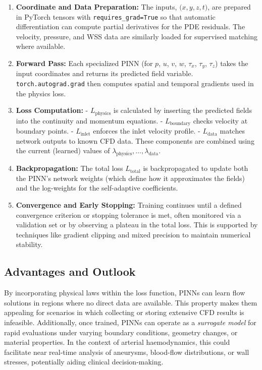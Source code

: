 \documentclass[12pt, a4paper]{article}
\begin{document}
\begin{enumerate}
  \item \textbf{Coordinate and Data Preparation:}
    The inputs, \(\bigl(x,y,z,t\bigr)\), are prepared in PyTorch tensors with
    \texttt{requires\_grad=True} so that automatic differentiation can compute
    partial derivatives for the PDE residuals. The velocity, pressure, and WSS data
    are similarly loaded for supervised matching where available.
  \item \textbf{Forward Pass:} 
    Each specialized PINN (for \(p\), \(u\), \(v\), \(w\), \(\tau_x\), \(\tau_y\), \(\tau_z\))
    takes the input coordinates and returns its predicted field variable. 
    \texttt{torch.autograd.grad} then computes spatial and temporal gradients
    used in the physics loss.
  \item \textbf{Loss Computation:}
    - \(L_{\mathrm{physics}}\) is calculated by inserting the predicted fields 
      into the continuity and momentum equations.
    - \(L_{\mathrm{boundary}}\) checks velocity at boundary points.
    - \(L_{\mathrm{inlet}}\) enforces the inlet velocity profile.
    - \(L_{\mathrm{data}}\) matches network outputs to known CFD data.
    These components are combined using the current (learned) values of 
    \(\lambda_{\mathrm{physics}}, \ldots, \lambda_{\mathrm{data}}\).
  \item \textbf{Backpropagation:} 
    The total loss \(L_{\mathrm{total}}\) is backpropagated to update both the
    PINN’s network weights (which define how it approximates the fields) and the
    log-weights for the self-adaptive coefficients.
  \item \textbf{Convergence and Early Stopping:}
    Training continues until a defined convergence criterion or stopping
    tolerance is met, often monitored via a validation set or by observing a
    plateau in the total loss. This is supported by techniques like gradient
    clipping and mixed precision to maintain numerical stability.
\end{enumerate}

\subsection{Advantages and Outlook}

By incorporating physical laws within the loss function, PINNs can learn
flow solutions in regions where no direct data are available. This property
makes them appealing for scenarios in which collecting or storing extensive
CFD results is infeasible. Additionally, once trained, PINNs can operate as
a \emph{surrogate model} for rapid evaluations under varying boundary
conditions, geometry changes, or material properties. In the context of
arterial haemodynamics, this could facilitate near real-time analysis of
aneurysms, blood-flow distributions, or wall stresses, potentially aiding
clinical decision-making.
\end{document}
